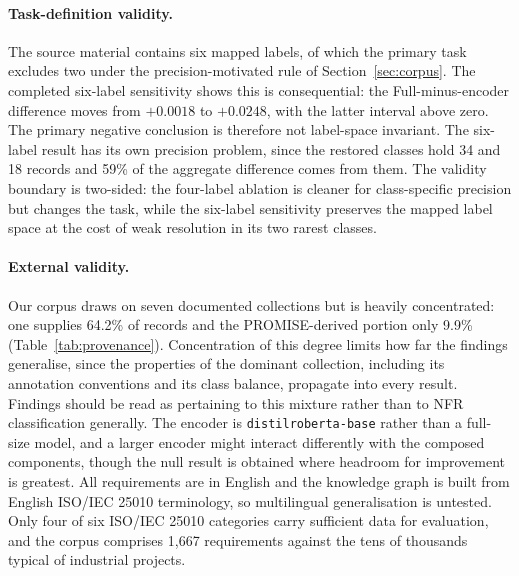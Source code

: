 \documentclass[11pt,a4paper]{article}
\begin{document}
\paragraph{Task-definition validity.}
The source material contains six mapped labels, of which the primary task excludes two under the
precision-motivated rule of Section~\ref{sec:corpus}. The completed six-label sensitivity shows this is
consequential: the Full-minus-encoder difference moves from $+0.0018$ to $+0.0248$, with the latter
interval above zero. The primary negative conclusion is therefore not label-space invariant. The six-label
result has its own precision problem, since the restored classes hold 34 and 18 records and 59\% of the
aggregate difference comes from them. The validity boundary is two-sided: the four-label ablation is
cleaner for class-specific precision but changes the task, while the six-label sensitivity preserves the
mapped label space at the cost of weak resolution in its two rarest classes.

\paragraph{External validity.}
Our corpus draws on seven documented collections but is heavily concentrated: one supplies
64.2\% of records and the PROMISE-derived portion only 9.9\% (Table~\ref{tab:provenance}).
Concentration of this degree limits how far the findings generalise, since the properties of
the dominant collection, including its annotation conventions and its class balance,
propagate into every result. Findings should be read as pertaining to this mixture rather
than to NFR classification generally. The encoder is \texttt{distilroberta-base} rather than a full-size model, and a larger encoder might interact differently with the composed components,
though the null result is obtained where headroom for improvement is greatest. All
requirements are in English and the knowledge graph is built from English ISO/IEC 25010
terminology, so multilingual generalisation is untested. Only four of six ISO/IEC 25010
categories carry sufficient data for evaluation, and the corpus comprises 1{,}667
requirements against the tens of thousands typical of industrial projects.
\end{document}
